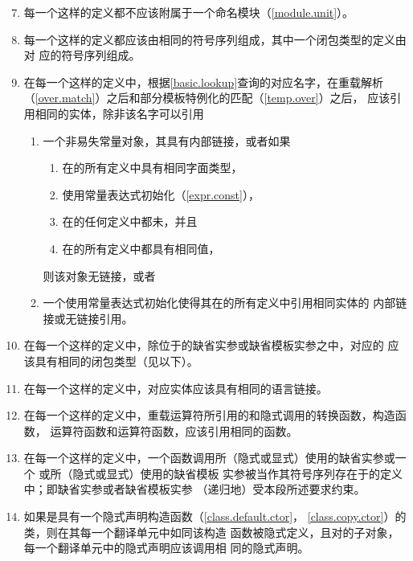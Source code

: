 \begin{enumerate}
  \setcounter{enumi}{6}
  \item 每一个这样的定义都不应该附属于一个命名模块（\ref{module.unit}）。
  \item \begin{sloppypar}
          每一个这样的定义都应该由相同的符号序列组成，其中一个闭包类型的定义由对
          应的符号序列组成。
        \end{sloppypar}
  \item 在每一个这样的定义中，根据\ref{basic.lookup}查询的对应名字，在重载解析
        （\ref{over.match}）之后和部分模板特例化的匹配（\ref{temp.over}）之后，
        应该引用相同的实体，除非该名字可以引用
        \begin{enumerate}
          \item 一个非易失常量对象，其具有内部链接，或者如果
                \begin{enumerate}
                  \item 在的所有定义中具有相同字面类型，
                  \item 使用常量表达式初始化（\ref{expr.const}），
                  \item 在的任何定义中都未\odrused{}，并且
                  \item 在的所有定义中都具有相同值，
                \end{enumerate}
                则该对象无链接，或者
          \item 一个使用常量表达式初始化使得其在的所有定义中引用相同实体的
                内部链接或无链接引用。
        \end{enumerate}
  \item 在每一个这样的定义中，除位于的缺省实参或缺省模板实参之中，对应的
          应该具有相同的闭包类型（见以下）。
  \item 在每一个这样的定义中，对应实体应该具有相同的语言链接。
  \item 在每一个这样的定义中，重载运算符所引用的和隐式调用的转换函数，构造函数，
        运算符函数和运算符函数，应该引用相同的函数。
  \item 在每一个这样的定义中，一个函数调用所（隐式或显式）使用的缺省实参或一个
        或所（隐式或显式）使用的缺省模板
        实参被当作其符号序列存在于的定义中；即缺省实参或者缺省模板实参
        （递归地）受本段所述要求约束。
  \item 如果是具有一个隐式声明构造函数（\ref{class.default.ctor}，
        \ref{class.copy.ctor}）的类，则在其\odrused{}每一个翻译单元中如同该构造
        函数被隐式定义，且对的子对象，每一个翻译单元中的隐式声明应该调用相
        同的隐式声明。


\end{enumerate}
